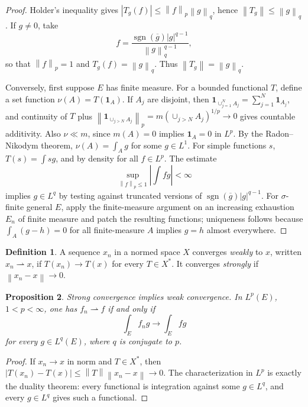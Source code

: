\documentclass[11pt,openany]{book}
\numberwithin{equation}{chapter}
\theoremstyle{definition}
\newtheorem{definition}{Definition}[chapter]
\theoremstyle{plain}
\newtheorem{proposition}[definition]{Proposition}
\theoremstyle{remark}
\newcommand{\1}{\mathbf{1}}
\newcommand{\abs}[1]{\left\lvert #1\right\rvert}
\newcommand{\norm}[1]{\left\lVert #1\right\rVert}
\newcommand{\sgn}{\operatorname{sgn}}
\begin{document}
\begin{proof}
Holder's inequality gives \(\abs{T_g(f)}\le\norm f_p\norm g_q\), hence \(\norm{T_g}\le\norm g_q\).  If \(g\ne0\), take
\[
    f=\frac{\sgn(\overline g)\abs g^{q-1}}{\norm g_q^{q-1}},
\]
so that \(\norm f_p=1\) and \(T_g(f)=\norm g_q\).  Thus \(\norm{T_g}=\norm g_q\).

Conversely, first suppose \(E\) has finite measure.  For a bounded functional \(T\), define a set function \(\nu(A)=T(\1_A)\).  If \(A_j\) are disjoint, then \(\1_{\cup_{j=1}^N A_j}=\sum_{j=1}^N\1_{A_j}\), and continuity of \(T\) plus \(\norm{\1_{\cup_{j>N}A_j}}_p=m(\cup_{j>N}A_j)^{1/p}\to0\) gives countable additivity.  Also \(\nu\ll m\), since \(m(A)=0\) implies \(\1_A=0\) in \(L^p\).  By the Radon--Nikodym theorem, \(\nu(A)=\int_Ag\) for some \(g\in L^1\).  For simple functions \(s\), \(T(s)=\int sg\), and by density for all \(f\in L^p\).  The estimate
\[
    \sup_{\norm f_p\le1}\abs{\int fg}<\infty
\]
implies \(g\in L^q\) by testing against truncated versions of \(\sgn(\overline g)\abs g^{q-1}\).  For \(\sigma\)-finite general \(E\), apply the finite-measure argument on an increasing exhaustion \(E_n\) of finite measure and patch the resulting functions; uniqueness follows because \(
\int_A(g-h)=0\) for all finite-measure \(A\) implies \(g=h\) almost everywhere.
\end{proof}

\begin{definition}
A sequence \(x_n\) in a normed space \(X\) converges \emph{weakly} to \(x\), written \(x_n\rightharpoonup x\), if \(T(x_n)\to T(x)\) for every \(T\in X^*\).  It converges \emph{strongly} if \(\norm{x_n-x}\to0\).
\end{definition}

\begin{proposition}
Strong convergence implies weak convergence.  In \(L^p(E)\), \(1<p<\infty\), one has \(f_n\rightharpoonup f\) if and only if
\[
    \int_E f_n g\to\int_E f g
\]
for every \(g\in L^q(E)\), where \(q\) is conjugate to \(p\).
\end{proposition}

\begin{proof}
If \(x_n\to x\) in norm and \(T\in X^*\), then \(\abs{T(x_n)-T(x)}\le\norm T\norm{x_n-x}\to0\).  The characterization in \(L^p\) is exactly the duality theorem: every functional is integration against some \(g\in L^q\), and every \(g\in L^q\) gives such a functional.
\end{proof}
\end{document}
